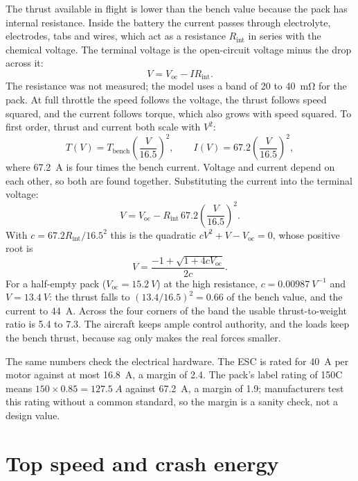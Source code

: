 The thrust available in flight is lower than the bench value because the pack has internal resistance. Inside the battery the current passes through electrolyte, electrodes, tabs and wires, which act as a resistance $R_\text{int}$ in series with the chemical voltage. The terminal voltage is the open-circuit voltage minus the drop across it:
\begin{equation}
V = V_\text{oc} - I R_\text{int}.
\end{equation}
The resistance was not measured; the model uses a band of 20 to \SI{40}{\milli\ohm} for the pack. At full throttle the speed follows the voltage, the thrust follows speed squared, and the current follows torque, which also grows with speed squared. To first order, thrust and current both scale with $V^2$:
\begin{equation}
T(V) = T_\text{bench}\left(\frac{V}{16.5}\right)^2, \qquad I(V) = 67.2\left(\frac{V}{16.5}\right)^2,
\end{equation}
where \SI{67.2}{A} is four times the bench current. Voltage and current depend on each other, so both are found together. Substituting the current into the terminal voltage:
\begin{equation}
V = V_\text{oc} - R_\text{int}\, 67.2 \left(\frac{V}{16.5}\right)^2.
\end{equation}
With $c = 67.2 R_\text{int}/16.5^2$ this is the quadratic $cV^2 + V - V_\text{oc} = 0$, whose positive root is
\begin{equation}
V = \frac{-1 + \sqrt{1 + 4cV_\text{oc}}}{2c}.
\end{equation}
For a half-empty pack ($V_\text{oc} = \SI{15.2}{V}$) at the high resistance, $c = \SI{0.00987}{V^{-1}}$ and $V = \SI{13.4}{V}$: the thrust falls to $(13.4/16.5)^2 = 0.66$ of the bench value, and the current to \SI{44}{A}. Across the four corners of the band the usable thrust-to-weight ratio is 5.4 to 7.3. The aircraft keeps ample control authority, and the loads keep the bench thrust, because sag only makes the real forces smaller.

The same numbers check the electrical hardware. The ESC is rated for \SI{40}{A} per motor against at most \SI{16.8}{A}, a margin of 2.4. The pack's label rating of 150C means $150 \times 0.85 = \SI{127.5}{A}$ against \SI{67.2}{A}, a margin of 1.9; manufacturers test this rating without a common standard, so the margin is a sanity check, not a design value.

\section{Top speed and crash energy}\label{sec:loads-speed}

